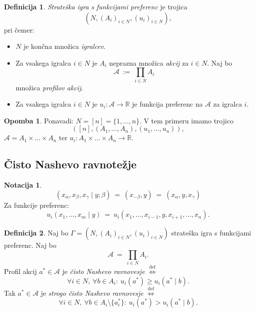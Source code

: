 \documentclass[11pt]{article}
\newcommand{\R}{\mathbb{R}}
\newcommand{\A}{\mathcal{A}}
\newcommand{\diff}{\overset{\text{def}}{\iff}}
\newcommand{\set}[1]{\{#1\}}
\theoremstyle{definition}
\newtheorem{definicija}{Definicija}[section]
\theoremstyle{definition}
\theoremstyle{definition}
\theoremstyle{definition}
\newtheorem*{opomba}{Opomba}
\newtheorem*{notacija}{Notacija}
\begin{document}
\begin{definicija}

\textit{Strateška igra s funkcijami preferenc} je trojica
$$(N, (A_i)_{i \in N}, (u_i)_{i \in N}),$$
pri čemer:
\begin{itemize}
	\item $N$ je končna množica \textit{igralcev}.
	\item Za vsakega igralca $i \in N$ je $A_i$ neprazna množica \textit{akcij} za $i \in N$. Naj bo 
	$$\A ~:=~ \prod_{i \in N} A_i$$
	množica \textit{profilov akcij}.
	\item Za vsakega igralca $i \in N$ je $u_i: \A \rightarrow \R$ je funkcija preferenc na $\A$ za igralca $i$.
\end{itemize}

\end{definicija}
\vspace{0.5cm}

\begin{opomba}

Ponavadi: $N = [n] = \set{1,\ldots,n}$. V tem primeru imamo trojico
$$([n],(A_1,\ldots,A_n),(u_1,\ldots,u_n)),$$
$\A=A_1 \times \ldots \times A_n$ ter $u_i: A_1 \times \ldots \times A_n \rightarrow \R$.

\end{opomba}
\vspace{0.5cm}


\subsection{Čisto Nashevo ravnotežje}
\vspace{0.5cm}

\begin{notacija}

$$(x_\alpha, x_\beta, x_\gamma \mid y; \beta) ~=~ (x_{-\beta}, y) ~=~ (x_\alpha, y, x_\gamma)$$
Za funkcije preferenc:
$$u_i(x_1,\ldots,x_m \mid y) ~=~ u_i(x_1,\ldots,x_{i-1},y,x_{i+1},\ldots,x_n).$$

\end{notacija}
\vspace{0.5cm}

\begin{definicija}

Naj bo $\Gamma = (N, (A_i)_{i \in N}, (u_i)_{i \in N})$ strateška igra s funkcijami preferenc. Naj bo
$$\A ~=~ \prod_{i \in N} A_i.$$
Profil akcij $a^* \in \A$ je \textit{čisto Nashevo ravnovesje} $\diff$
$$\forall i \in N, ~\forall b \in A_i: ~u_i(a^*) \geq u_i(a^* \mid b).$$
Tak $a^* \in \A$ je \textit{strogo čisto Nashevo ravnovesje} $\diff$
$$\forall i \in N, ~\forall b \in A_i\setminus\set{a_i^*}: ~u_i(a^*) > u_i(a^* \mid b).$$

\end{definicija}
\vspace{0.5cm}
\end{document}

